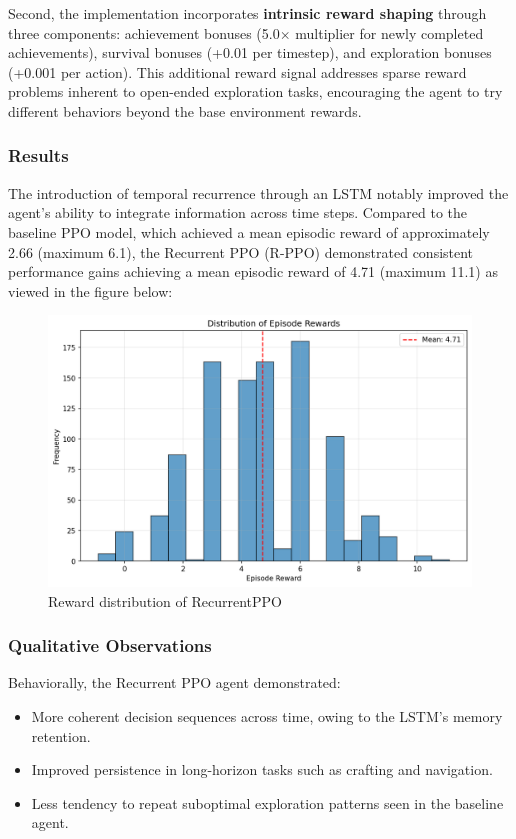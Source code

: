 \documentclass[twocolumn]{article}
\begin{document}
Second, the implementation incorporates \textbf{intrinsic reward shaping} through three components: achievement bonuses (5.0\(\times\) multiplier for newly completed achievements), survival bonuses (+0.01 per timestep), and exploration bonuses (+0.001 per action). This additional reward signal addresses sparse reward problems inherent to open-ended exploration tasks, encouraging the agent to try different behaviors beyond the base environment rewards.

\subsubsection*{Results}
The introduction of temporal recurrence through an LSTM notably improved the agent's ability to integrate information across time steps. Compared to the baseline PPO model, which achieved a mean episodic reward of approximately 2.66 (maximum 6.1), the Recurrent PPO (R-PPO) demonstrated consistent performance gains achieving a mean episodic reward of 4.71 (maximum 11.1) as viewed in the figure below: 
\begin{figure}[H]
    \centering
    \includegraphics[width=0.75\linewidth]{images/reward_distribution_ppo_improv2_1000_episodes.png}
    \caption{Reward distribution of RecurrentPPO}
    \label{fig:placeholder}
\end{figure}

\subsubsection*{Qualitative Observations}

Behaviorally, the Recurrent PPO agent demonstrated:
\begin{itemize}
    \item More coherent decision sequences across time, owing to the LSTM's memory retention.
    \item Improved persistence in long-horizon tasks such as crafting and navigation.
    \item Less tendency to repeat suboptimal exploration patterns seen in the baseline agent.
\end{itemize}
\end{document}
